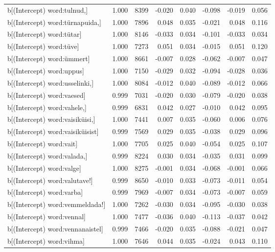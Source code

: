 \begin{longtable}{lrrrrrrr}
  b[(Intercept) word:tulnud,] & 1.000 & 8399 & -0.020 & 0.040 & -0.098 & -0.019 & 0.056 \\ 
  b[(Intercept) word:türnapuida,] & 1.000 & 7896 & 0.048 & 0.035 & -0.021 & 0.048 & 0.116 \\ 
  b[(Intercept) word:tütar] & 1.000 & 8146 & -0.033 & 0.034 & -0.101 & -0.033 & 0.034 \\ 
  b[(Intercept) word:tüve] & 1.000 & 7273 & 0.051 & 0.034 & -0.015 & 0.051 & 0.120 \\ 
  b[(Intercept) word:ümmert] & 1.000 & 8661 & -0.007 & 0.028 & -0.062 & -0.007 & 0.047 \\ 
  b[(Intercept) word:uppus] & 1.000 & 7150 & -0.029 & 0.032 & -0.094 & -0.028 & 0.036 \\ 
  b[(Intercept) word:usselinki,] & 1.000 & 8084 & -0.012 & 0.040 & -0.089 & -0.012 & 0.066 \\ 
  b[(Intercept) word:vaesed] & 0.999 & 7031 & -0.020 & 0.030 & -0.079 & -0.020 & 0.038 \\ 
  b[(Intercept) word:vahele,] & 0.999 & 6831 & 0.042 & 0.027 & -0.010 & 0.042 & 0.095 \\ 
  b[(Intercept) word:vaisiküisi,] & 1.000 & 7441 & 0.007 & 0.035 & -0.060 & 0.006 & 0.076 \\ 
  b[(Intercept) word:vaisiküisist] & 0.999 & 7569 & 0.029 & 0.035 & -0.038 & 0.029 & 0.096 \\ 
  b[(Intercept) word:vait] & 1.000 & 7705 & 0.025 & 0.040 & -0.054 & 0.025 & 0.107 \\ 
  b[(Intercept) word:valada,] & 0.999 & 8224 & 0.030 & 0.034 & -0.035 & 0.031 & 0.099 \\ 
  b[(Intercept) word:valge] & 1.000 & 8275 & -0.001 & 0.034 & -0.068 & -0.001 & 0.066 \\ 
  b[(Intercept) word:valutave!] & 0.999 & 8650 & -0.010 & 0.033 & -0.073 & -0.011 & 0.054 \\ 
  b[(Intercept) word:varba] & 0.999 & 7969 & -0.007 & 0.034 & -0.073 & -0.007 & 0.059 \\ 
  b[(Intercept) word:vemmeldada!] & 1.000 & 7262 & -0.030 & 0.034 & -0.095 & -0.030 & 0.038 \\ 
  b[(Intercept) word:vennal] & 1.000 & 7477 & -0.036 & 0.040 & -0.113 & -0.037 & 0.042 \\ 
  b[(Intercept) word:vennanaistel] & 0.999 & 7466 & -0.020 & 0.035 & -0.088 & -0.021 & 0.047 \\ 
  b[(Intercept) word:vihma] & 1.000 & 7646 & 0.044 & 0.035 & -0.024 & 0.043 & 0.110 \\ 

\end{longtable}
